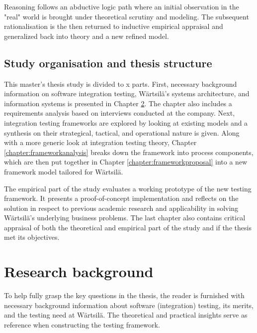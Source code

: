 \documentclass[12pt,a4paper,oneside,pdftex]{report}
\begin{document}
Reasoning follows an abductive logic path where an initial observation in the "real" world is brought under theoretical scrutiny and modeling. The subsequent rationalisation is the then returned to inductive empirical appraisal and generalized back into theory and a new refined model. %


\section{Study organisation and thesis structure}
\label{section:structure}
This master's thesis study is divided to x parts. First, necessary background information on software integration testing, Wärtsilä's systems architecture, and information systems is presented in Chapter \ref{chapter:background}. The chapter also includes a requirements analysis based on interviews conducted at the company. Next, integration testing frameworks are explored by looking at existing models and a synthesis on their strategical, tactical, and operational nature is given. Along with a more generic look at integration testing theory, Chapter \ref{chapter:frameworkanalysis} breaks down the framework into process components, which are then put together in Chapter \ref{chapter:frameworkproposal} into a new framework model tailored for Wärtsilä.

The empirical part of the study evaluates a working prototype of the new testing framework. It presents a proof-of-concept implementation and reflects on the solution in respect to previous academic research and applicability in solving Wärtsilä's underlying business problems. The last chapter also contains critical appraisal of both the theoretical and empirical part of the study and if the thesis met its objectives.

\chapter{Research background}
\label{chapter:background}

To help fully grasp the key questions in the thesis, the reader is furnished with necessary background information about software (integration) testing, its merits, and the testing need at Wärtsilä. The theoretical and practical insights serve as reference when constructing the testing framework. 
\end{document}
